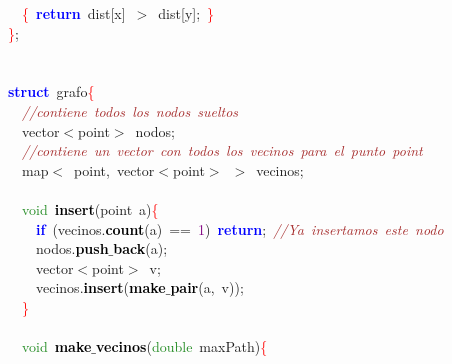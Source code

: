 \mbox{}\ \ \textcolor{Red}{\{}\ \textbf{\textcolor{Blue}{return}}\ dist\textcolor{BrickRed}{[}x\textcolor{BrickRed}{]}\ \textcolor{BrickRed}{$>$}\ dist\textcolor{BrickRed}{[}y\textcolor{BrickRed}{];}\ \textcolor{Red}{\}} \\
\mbox{}\textcolor{Red}{\}}\textcolor{BrickRed}{;} \\
\mbox{} \\
\mbox{} \\
\mbox{}\textbf{\textcolor{Blue}{struct}}\ grafo\textcolor{Red}{\{} \\
\mbox{}\ \ \textit{\textcolor{Brown}{//contiene\ todos\ los\ nodos\ sueltos}} \\
\mbox{}\ \ vector\textcolor{BrickRed}{$<$}point\textcolor{BrickRed}{$>$}\ nodos\textcolor{BrickRed}{;} \\
\mbox{}\ \ \textit{\textcolor{Brown}{//contiene\ un\ vector\ con\ todos\ los\ vecinos\ para\ el\ punto\ point}} \\
\mbox{}\ \ map\textcolor{BrickRed}{$<$}\ point\textcolor{BrickRed}{,}\ vector\textcolor{BrickRed}{$<$}point\textcolor{BrickRed}{$>$}\ \textcolor{BrickRed}{$>$}\ vecinos\textcolor{BrickRed}{;} \\
\mbox{} \\
\mbox{}\ \ \textcolor{ForestGreen}{void}\ \textbf{\textcolor{Black}{insert}}\textcolor{BrickRed}{(}point\ a\textcolor{BrickRed}{)}\textcolor{Red}{\{} \\
\mbox{}\ \ \ \ \textbf{\textcolor{Blue}{if}}\ \textcolor{BrickRed}{(}vecinos\textcolor{BrickRed}{.}\textbf{\textcolor{Black}{count}}\textcolor{BrickRed}{(}a\textcolor{BrickRed}{)}\ \textcolor{BrickRed}{==}\ \textcolor{Purple}{1}\textcolor{BrickRed}{)}\ \textbf{\textcolor{Blue}{return}}\textcolor{BrickRed}{;}\ \textit{\textcolor{Brown}{//Ya\ insertamos\ este\ nodo}} \\
\mbox{}\ \ \ \ nodos\textcolor{BrickRed}{.}\textbf{\textcolor{Black}{push$\_$back}}\textcolor{BrickRed}{(}a\textcolor{BrickRed}{);} \\
\mbox{}\ \ \ \ vector\textcolor{BrickRed}{$<$}point\textcolor{BrickRed}{$>$}\ v\textcolor{BrickRed}{;} \\
\mbox{}\ \ \ \ vecinos\textcolor{BrickRed}{.}\textbf{\textcolor{Black}{insert}}\textcolor{BrickRed}{(}\textbf{\textcolor{Black}{make$\_$pair}}\textcolor{BrickRed}{(}a\textcolor{BrickRed}{,}\ v\textcolor{BrickRed}{));} \\
\mbox{}\ \ \textcolor{Red}{\}} \\
\mbox{} \\
\mbox{}\ \ \textcolor{ForestGreen}{void}\ \textbf{\textcolor{Black}{make$\_$vecinos}}\textcolor{BrickRed}{(}\textcolor{ForestGreen}{double}\ maxPath\textcolor{BrickRed}{)}\textcolor{Red}{\{} \\
